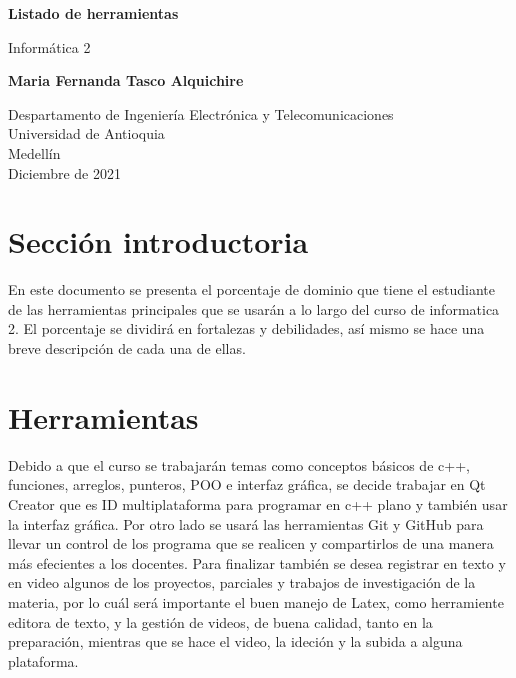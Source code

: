 \documentclass{article}
\begin{document}
\begin{titlepage}
    \begin{center}
        \vspace*{1cm}
            
        \Huge
        \textbf{Listado de herramientas}
            
        \vspace{1 cm}
        \LARGE
        Informática 2
        \vspace{5cm}
            
        \textbf{Maria Fernanda Tasco Alquichire}
            
        \vfill
            
        \vspace{0.8cm}
            
        \Large
        Despartamento de Ingeniería Electrónica y Telecomunicaciones\\
        Universidad de Antioquia\\
        Medellín\\
        Diciembre de 2021
            
    \end{center}
\end{titlepage}

\tableofcontents
\newpage
\section{Sección introductoria}\label{intro}
En este documento se presenta el porcentaje de dominio que tiene el estudiante de las herramientas principales que se usarán a lo largo del curso de informatica 2. El porcentaje se dividirá en fortalezas y debilidades, así mismo se hace una breve descripción de cada una de ellas.

\section{Herramientas} \label{contenido}
{
Debido a que el curso se trabajarán temas como conceptos básicos de c++, funciones, arreglos, punteros, POO e interfaz gráfica, se decide trabajar en Qt Creator que es ID multiplataforma para programar en c++ plano y también usar la interfaz gráfica. Por otro lado se usará las herramientas Git y GitHub para llevar un control de los programa que se realicen y compartirlos de una manera más efecientes a los docentes. Para finalizar también se desea registrar en texto y en video algunos de los proyectos, parciales y trabajos de investigación de la materia, por lo cuál será importante el buen manejo de Latex, como herramiente editora de texto, y la gestión de videos, de buena calidad, tanto en la preparación, mientras que se hace el video, la ideción y la subida a alguna plataforma.
}
\end{document}
